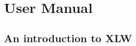
\hypertarget{usermanual}{}\part{User Manual}\label{usermanual}

\hypertarget{qlintro}{}\chapter{An introduction to XLW}\label{qlintro}















